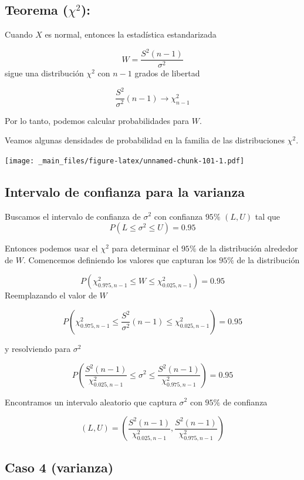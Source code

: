\documentclass[
]{book}
\begin{document}
\hypertarget{teorema-chi2}{%
\subsection{\texorpdfstring{Teorema (\(\chi^2\)):}{Teorema (\textbackslash chi\^{}2):}}\label{teorema-chi2}}

Cuando \(X\) es normal, entonces la estadística estandarizada

\[W=\frac{S^2(n-1)}{\sigma^2}\]
sigue una distribución \(\chi^2\) con \(n-1\) grados de libertad

\[\frac{S^2}{\sigma^2}(n-1)\rightarrow \chi^2_{n-1}\]

Por lo tanto, podemos calcular probabilidades para \(W\).

Veamos algunas densidades de probabilidad en la familia de las distribuciones \(\chi^2\).

\texttt{[image: \_main\_files/figure-latex/unnamed-chunk-101-1.pdf]}

\hypertarget{intervalo-de-confianza-para-la-varianza-1}{%
\subsection{Intervalo de confianza para la varianza}\label{intervalo-de-confianza-para-la-varianza-1}}

Buscamos el intervalo de confianza de \(\sigma^2\) con confianza \(95\%\) \((L,U)\) tal que \[P(L \leq \sigma^2 \leq U)=0.95\]

Entonces podemos usar el \(\chi^2\) para determinar el \(95\%\) de la distribución alrededor de \(W\). Comencemos definiendo los valores que capturan los \(95\%\) de la distribución

\[P(\chi^2_{0.975,n-1} \leq W \leq \chi^2_{0.025,n-1})=0.95\]
Reemplazando el valor de \(W\)

\[P(\chi^2_{0.975,n-1} \leq \frac{S^2}{\sigma^2}(n-1) \leq \chi^2_{0.025,n-1})= 0.95\]

y resolviendo para \(\sigma^2\)

\[P(\frac{S^2 (n-1)}{\chi^2_{0.025,n-1}}\leq \sigma^2 \leq \frac{S^2(n-1)}{ \chi^2_{0.975,n-1}})=0.95\]

Encontramos un intervalo aleatorio que captura \(\sigma^2\)
con \(95\%\) de confianza

\[(L,U) = (\frac{S^2 (n-1)}{\chi^2_{0.025,n-1}},\frac{S^2(n-1)}{\chi ^2_{0.975,n-1}})\]

\hypertarget{caso-4-varianza}{%
\subsection{Caso 4 (varianza)}\label{caso-4-varianza}}
\end{document}
